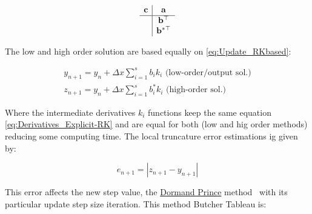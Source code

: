 
\begin{equation} 
    \begin{array}{c|c}
        \mathbf{c} & \mathbf{a} \\
        \hline
        & \mathbf{b}^\top  \\
        & \mathbf{b}^{*\top }
    \end{array}
    \label{eq:Explicit_Butcher_Tableu}
\end{equation}


The low and high order solution are based equally on \ref{eq:Update_RKbased}:

\begin{subequations}
    \begin{align}
        y_{n+1} = y_n + \Delta x \sum^{s}_{i=1}b_i k_i \text{  (low-order/output sol.)} \label{eq:Update_Output_adaptiveRK} \\
        z_{n+1} = y_n + \Delta x \sum^{s}_{i=1}b^*_i k_i \text{  (high-order sol.)} \label{eq:Update_HighOrder_adaptiveRK} 
    \end{align}
    \label{eq:Update_Adaptive-RK}  
\end{subequations}

Where the intermediate derivatives \(k_i\) functions keep the same equation \ref{eq:Derivatives_Explicit-RK} and are equal for both (low and hig order methods) reducing some computing time. The local truncature error estimations ig given by:

\begin{equation}
    e_{n+1} = |z_{n+1} - y_{n+1}|
    \label{eq:Local_Truncature_Erro_Estimation_AdaptiveRK}
\end{equation}

This error affects the new step value, the \underline{Dormand Prince} method~\cite{kimura2009dormand} with its particular update step size iteration. This method Butcher Tableau is:

